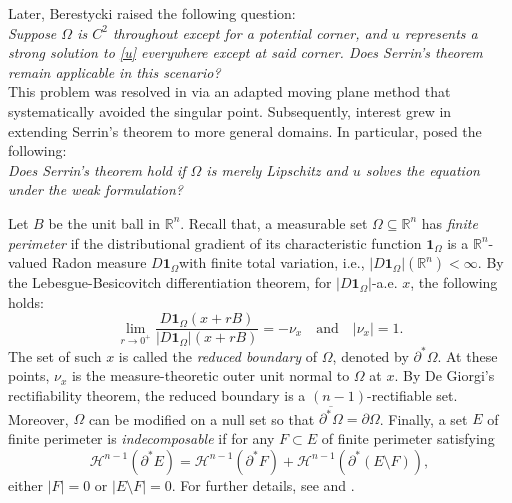 \documentclass[reqno,11pt]{amsart}
\newcommand{\R}{\mathbb{R}}
\numberwithin{equation}{section}
\theoremstyle{remark}
\begin{document}
Later, Berestycki raised the following question:\\
{\it Suppose $\Omega$ is $C^2$ throughout except for a potential corner, and $u$ represents a strong solution to \eqref{u} everywhere except at said corner. Does Serrin's theorem remain applicable in this scenario?}\\
This problem was resolved in \cite{P1998} via an adapted moving plane method that systematically avoided the singular point.
Subsequently, interest grew in extending Serrin's theorem to more general domains. In particular, \cite[Question 7.1]{HLL2024} posed the following:\\
{\it Does Serrin's theorem  hold if $\Omega$ is merely Lipschitz and $u$ solves the equation under the weak formulation?}

Let $B$ be the unit ball in $\mathbb R^n$.
Recall that, a measurable set $\Omega\subseteq \R^n$ has \emph{finite perimeter} if the distributional gradient of its characteristic function  $\mathbf{1}_\Omega$ is a $\R^n$-valued Radon measure $D\mathbf{1}_\Omega$with finite total variation, i.e., $|D\mathbf{1}_\Omega|(\R^n)<\infty$.
By the Lebesgue-Besicovitch differentiation theorem, for  $|D\mathbf{1}_{\Omega}|$-a.e. $x$, the following holds:
\begin{equation*} 
\lim_{r\to 0^+}\frac{D\mathbf{1}_\Omega(x+rB)}{|D\mathbf{1}_\Omega|(x+rB)} = -\nu_x \quad \text{and} \quad |\nu_x| = 1.
\end{equation*}
The set of such $x$ is called the \emph{reduced boundary} of  $\Omega$, denoted by $\partial^*\Omega$.
 At these points,  $\nu_x$  is the measure-theoretic outer unit normal to $\Omega$ at $x$.
By De Giorgi's rectifiability theorem,  the reduced boundary is a $(n-1)$-rectifiable set. Moreover, $\Omega$ can be modified on a null set so that $\overline{\partial^* \Omega}=\partial\Omega$.
Finally,  a set $E$ of finite perimeter is \emph{indecomposable} if for any   $ F \subset  E$ of finite perimeter satisfying
 $$\mathscr H^{n-1}(\partial^* E) = \mathscr H^{n-1}(\partial^* F) + \mathscr H^{n-1}(\partial^* (E\setminus F)), $$
either $|F|=0$ or $|E\setminus F|=0$. 
For further details, see \cite{ACMM2001} and \cite[Sections 12, 15]{M2012}.
\end{document}
